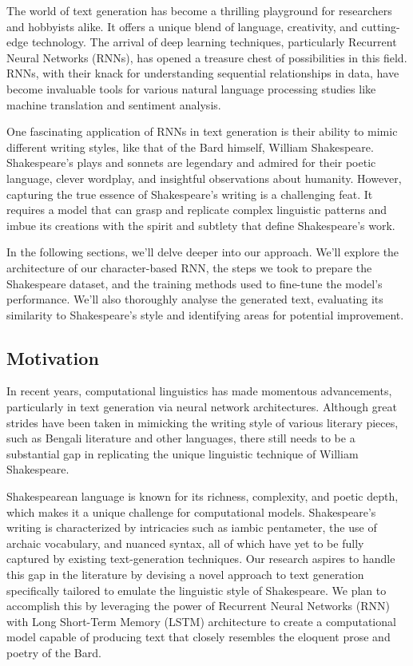 \documentclass[conference]{IEEEtran}
\begin{document}
The world of text generation has become a thrilling playground for researchers and hobbyists alike. It offers a unique blend of language, creativity, and cutting-edge technology. The arrival of deep learning techniques, particularly Recurrent Neural Networks (RNNs), has opened a treasure chest of possibilities in this field. RNNs, with their knack for understanding sequential relationships in data, have become invaluable tools for various natural language processing studies like machine translation and sentiment analysis.

One fascinating application of RNNs in text generation is their ability to mimic different writing styles, like that of the Bard himself, William Shakespeare. Shakespeare's plays and sonnets are legendary and admired for their poetic language, clever wordplay, and insightful observations about humanity. However, capturing the true essence of Shakespeare's writing is a challenging feat. It requires a model that can grasp and replicate complex linguistic patterns and imbue its creations with the spirit and subtlety that define Shakespeare's work.

In the following sections, we'll delve deeper into our approach. We'll explore the architecture of our character-based RNN, the steps we took to prepare the Shakespeare dataset, and the training methods used to fine-tune the model's performance. We'll also thoroughly analyse the generated text, evaluating its similarity to Shakespeare's style and identifying areas for potential improvement.

\subsection{Motivation}
In recent years, computational linguistics has made momentous advancements, particularly in text generation via neural network architectures. Although great strides have been taken in mimicking the writing style of various literary pieces, such as Bengali literature and other languages, there still needs to be a substantial gap in replicating the unique linguistic technique of William Shakespeare.

Shakespearean language is known for its richness, complexity, and poetic depth, which makes it a unique challenge for computational models. Shakespeare's writing is characterized by intricacies such as iambic pentameter, the use of archaic vocabulary, and nuanced syntax, all of which have yet to be fully captured by existing text-generation techniques. Our research aspires to handle this gap in the literature by devising a novel approach to text generation specifically tailored to emulate the linguistic style of Shakespeare. We plan to accomplish this by leveraging the power of Recurrent Neural Networks (RNN) with Long Short-Term Memory (LSTM) architecture to create a computational model capable of producing text that closely resembles the eloquent prose and poetry of the Bard.
\end{document}
